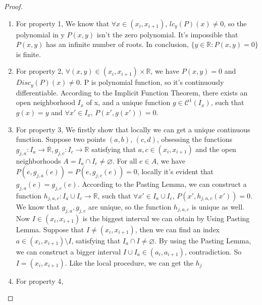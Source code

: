 \documentclass{article}
\begin{document}
\begin{proof}
    \begin{enumerate}
        \item  For property 1, We know that \(\forall x \in (x_{i},x_{i+1})\), \(lc_{y}(P)(x) \neq 0\), so the polynomial in y \(P(x,y)\) isn't the zero polynomial. It's impossible that \(P(x,y)\) has an infinite number of roots. In conclusion, $\lbrace y \in \mathbb{R} : P(x,y) = 0 \rbrace$ is finite.
        \item  For property 2, \(\forall (x, y) \in (x_{i},x_{i+1}) \times \mathbb{R}\), we have \(P(x,y)=0\) and \\\(Disc_{y}(P)(x) \neq 0\). P is polynomial function, so it's continuously differentiable. According to the Implicit Function Theorem, there exists an open neighborhood \(I_{x}\) of x, and a unique function \(g \in \mathcal{C}^{1}(I_{x})\), such that \(g(x) = y\) and \(\forall x' \in I_{x}\), \(P(x', g(x')) =0\).
        \item  For property 3, We firstly show that locally we can get a unique continuous function. Suppose two points $(a,b)$, $(c,d)$, obsessing the functions $g_{j,a}: I_{a} \to \mathbb{R}, g_{j,c}: I_{c} \to \mathbb{R}$ satisfying that $a, c \in (x_{i}, x_{i+1})$ and the open neighborhoods $A = I_{a} \cap I_{c} \neq \varnothing$. For all $e \in A$, we have $P(e,g_{j,a}(e)) = P(e,g_{j,c}(e)) = 0$, locally it's evident that $g_{j,a}(e) = g_{j,c}(e)$. According to the Pasting Lemma, we can construct a function $h_{j,a,c}: I_{a} \cup I_{c} \to \mathbb{R}$, such that $\forall x' \in I_{a} \cup I_{c}$, $P(x', h_{j,a,c}(x')) =0$. We know that $g_{j,a}, g_{j,c}$ are unique, so the function $h_{j,a,c}$ is unique as well. Now $I \in (x_{i}, x_{i+1})$ is the biggest interval  we can obtain by Using Pasting Lemma. Suppose that $I \neq (x_{i},x_{i+1})$, then we can find an index $a \in (x_{i},x_{i+1}) \setminus I$, satisfying that $I_{a} \cap I \neq \varnothing$. By using the Pasting Lemma, we can construct a bigger interval $I \cup I_{a} \in (a_{i}, a_{i+1})$, contradiction. So $I = (x_{i}, x_{i+1})$. Like the local procedure, we can get the $h_{j}$
        \item  For property 4, 
    \end{enumerate}
\end{proof}
\end{document}
